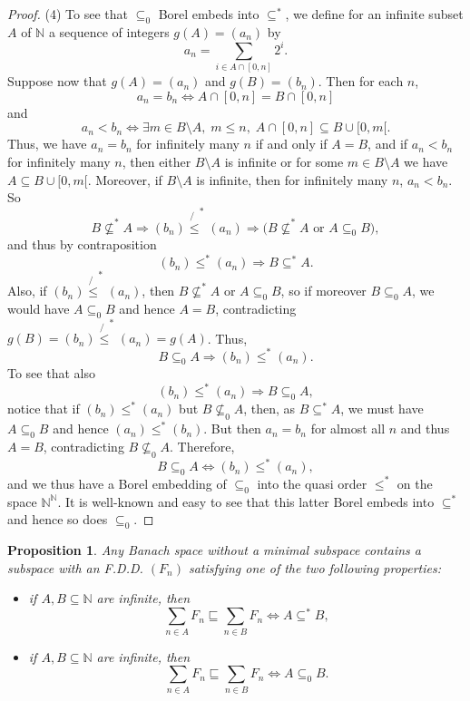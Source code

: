 \documentclass[10pt]{amsart}
\numberwithin{equation}{section}
\newtheorem{prop} [thm] {Proposition}
\begin{document}
\begin{proof}
(4) To see that $\subseteq_0$ Borel embeds into $\subseteq^*$, we define for an
infinite subset $A$ of ${\mathbb N}$ a sequence of integers $g(A)=(a_n)$ by
$$
a_n=\sum_{i\in A\cap [0,n]}2^i.
$$
Suppose now that $g(A)=(a_n)$ and $g(B)=(b_n)$. Then for each $n$,
$$
a_n=b_n{\Leftrightarrow} A\cap[0,n]=B\cap [0,n]
$$
and
$$
a_n<b_n{\Leftrightarrow} {\exists} m\in B\setminus A,\; m{\ensuremath{\leqslant}} n,\; A\cap [0,n]\subseteq B\cup [0,m[.
$$
Thus, we have $a_n=b_n$ for infinitely many $n$ if and only if $A=B$, and if
$a_n<b_n$ for infinitely many $n$, then either $B\setminus A$ is infinite or
for some $m\in B\setminus A$ we have $A\subseteq B\cup [0,m[$. Moreover, if
$B\setminus A$ is infinite, then for infinitely many $n$, $a_n<b_n$. So
$$
B\not\subseteq^*A{\Rightarrow} (b_n)\not{\ensuremath{\leqslant}}^*(a_n){\Rightarrow} \big( B\not\subseteq^*A \textrm{ or } A\subseteq_0B\big),
$$
and thus by contraposition
$$
(b_n){\ensuremath{\leqslant}}^*(a_n){\Rightarrow} B\subseteq^*A.
$$
Also, if $(b_n)\not{\ensuremath{\leqslant}}^*(a_n)$, then $B\not\subseteq^*A$ or $A\subseteq_0B$,
so if moreover $B\subseteq_0A$,  we would have $A\subseteq_0B$ and hence $A=B$,
contradicting $g(B)=(b_n)\not{\ensuremath{\leqslant}}^*(a_n)=g(A)$. Thus,
$$
B\subseteq_0A{\Rightarrow} (b_n){\ensuremath{\leqslant}}^*(a_n).
$$
To see that also
$$
(b_n){\ensuremath{\leqslant}}^*(a_n){\Rightarrow} B\subseteq_0A,
$$
notice that if $(b_n){\ensuremath{\leqslant}}^*(a_n)$ but $B\not\subseteq_0A$, then, as
$B\subseteq^*A$, we must have $A\subseteq_0B$ and hence $(a_n){\ensuremath{\leqslant}}^*(b_n)$. But
then $a_n=b_n$ for almost all $n$ and thus $A=B$, contradicting
$B\not\subseteq_0A$. Therefore,
$$
B\subseteq_0A{\Leftrightarrow} (b_n){\ensuremath{\leqslant}}^*(a_n),
$$
and  we thus have a Borel embedding of $\subseteq_0$ into the quasi order
${\ensuremath{\leqslant}}^*$ on the space ${\mathbb N}^{\mathbb N}$. It is well-known and easy to see that this
latter Borel embeds into $\subseteq^*$ and hence so does $\subseteq_0$.
\end{proof}

\begin{prop}\label{poset}
Any Banach space without a minimal subspace contains a subspace with an F.D.D.
$(F_n)$ satisfying one of the two following properties:
\begin{itemize}
  \item[(a)] if $A,B\subseteq {\mathbb N}$ are infinite, then
  $$
  \sum_{n\in A}F_n\sqsubseteq \sum_{n\in B}F_n{\Leftrightarrow} A\subseteq^*B,
  $$
    \item[(b)] if $A,B\subseteq {\mathbb N}$ are infinite, then
  $$
  \sum_{n\in A}F_n\sqsubseteq \sum_{n\in B}F_n{\Leftrightarrow} A\subseteq_0B.
  $$
\end{itemize}
\end{prop}
\end{document}
